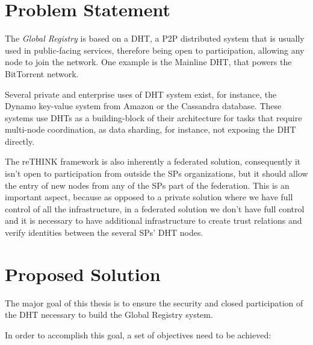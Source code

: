 \section{Problem Statement}
\label{section:problem-statement}

The \textit{Global Registry} is based on a \ac{DHT}, a \ac{P2P} distributed system  that is usually used in public-facing services, therefore being open to participation, allowing any node to join the network.
One example is the Mainline \ac{DHT}, that powers the BitTorrent network.

Several private and enterprise uses of DHT system exist, for instance, the Dynamo\cite{dynamo2007} key-value system from Amazon or the Cassandra\cite{cassandra2010} database.
These systems use \acp{DHT} as a building-block of their architecture for tasks that require multi-node coordination, as data sharding, for instance, not exposing the \ac{DHT} directly.

The reTHINK framework is also inherently a federated solution, consequently it isn't open to participation from outside the \acp{SP} organizations, but it should allow the entry of new nodes from any of the \acp{SP} part of the federation.
This is an important aspect, because as opposed to a private solution where we have full control of all the infrastructure, in a federated solution we don't have full control and it is necessary to have additional infrastructure to create trust relations and verify identities between the several \acp{SP}' \ac{DHT} nodes.

\section{Proposed Solution}
\label{section:proposed}

The major goal of this thesis is to ensure the security and closed participation of the \ac{DHT} necessary to build the Global Registry system.

In order to accomplish this goal, a set of objectives need to be achieved:

